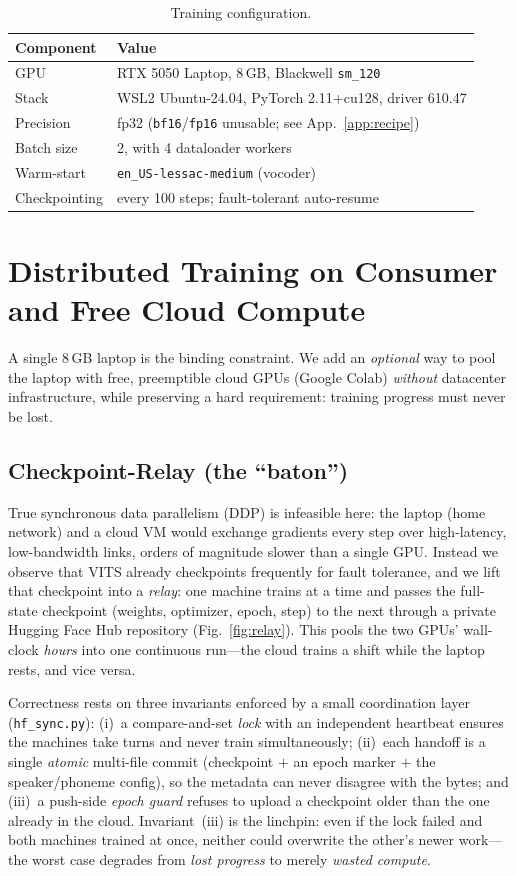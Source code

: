 \documentclass[conference]{IEEEtran}
\begin{document}
\begin{table}[t]
\caption{Training configuration.}
\label{tab:setup}
\centering
\begin{tabular}{@{}ll@{}}
\toprule
Component & Value \\
\midrule
GPU & RTX 5050 Laptop, 8\,GB, Blackwell \texttt{sm\_120} \\
Stack & WSL2 Ubuntu-24.04, PyTorch 2.11+cu128, driver 610.47 \\
Precision & fp32 (\texttt{bf16}/\texttt{fp16} unusable; see App.~\ref{app:recipe}) \\
Batch size & 2, with 4 dataloader workers \\
Warm-start & \texttt{en\_US-lessac-medium} (vocoder) \\
Checkpointing & every 100 steps; fault-tolerant auto-resume \\
\bottomrule
\end{tabular}
\end{table}

\section{Distributed Training on Consumer and Free Cloud Compute}
\label{sec:relay}
A single 8\,GB laptop is the binding constraint. We add an \emph{optional} way to pool the laptop with free,
preemptible cloud GPUs (Google Colab) \emph{without} datacenter infrastructure, while preserving a hard
requirement: training progress must never be lost.

\subsection{Checkpoint-Relay (the ``baton'')}
True synchronous data parallelism (DDP) is infeasible here: the laptop (home network) and a cloud VM would
exchange gradients every step over high-latency, low-bandwidth links, orders of magnitude slower than a single
GPU. Instead we observe that VITS already checkpoints frequently for fault tolerance, and we lift that
checkpoint into a \emph{relay}: one machine trains at a time and passes the full-state checkpoint (weights,
optimizer, epoch, step) to the next through a private Hugging Face Hub repository (Fig.~\ref{fig:relay}). This
pools the two GPUs' wall-clock \emph{hours} into one continuous run---the cloud trains a shift while the laptop
rests, and vice versa.

Correctness rests on three invariants enforced by a small coordination layer (\texttt{hf\_sync.py}):
(i)~a compare-and-set \emph{lock} with an independent heartbeat ensures the machines take turns and never train
simultaneously; (ii)~each handoff is a single \emph{atomic} multi-file commit (checkpoint $+$ an epoch marker
$+$ the speaker/phoneme config), so the metadata can never disagree with the bytes; and (iii)~a push-side
\emph{epoch guard} refuses to upload a checkpoint older than the one already in the cloud. Invariant~(iii) is
the linchpin: even if the lock failed and both machines trained at once, neither could overwrite the other's
newer work---the worst case degrades from \emph{lost progress} to merely \emph{wasted compute}.
\end{document}
